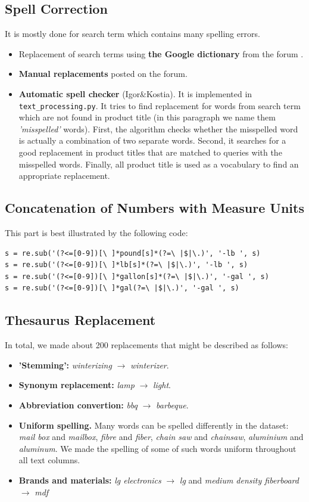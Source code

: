 \documentclass[12pt]{article}
\begin{document}
{{\subsection{Spell Correction}
It is mostly done for search term which contains many spelling errors.
\begin{itemize}
\item Replacement of search terms using \textbf{the Google dictionary} from the forum  \cite{Google_dict}.
\item \textbf{Manual replacements} posted on the forum.
\item \textbf{Automatic spell checker} (Igor\&Kostia). It is implemented in \texttt{text\_processing.py}. It tries to find replacement for words from search term which are not found in product title (in this paragraph we name them \emph{'misspelled'} words). First, the algorithm checks whether the misspelled word is actually a combination of two separate words. Second, it searches for a good replacement in product titles that are matched to queries with the misspelled words. Finally, all product title is used as a vocabulary to find an appropriate replacement.
\end{itemize}


\subsection{Concatenation of Numbers with Measure Units}
This part is best illustrated by the following code:

\begin{verbatim}
s = re.sub('(?<=[0-9])[\ ]*pound[s]*(?=\ |$|\.)', '-lb ', s)
s = re.sub('(?<=[0-9])[\ ]*lb[s]*(?=\ |$|\.)', '-lb ', s)
s = re.sub('(?<=[0-9])[\ ]*gallon[s]*(?=\ |$|\.)', '-gal ', s)
s = re.sub('(?<=[0-9])[\ ]*gal(?=\ |$|\.)', '-gal ', s)
\end{verbatim}


\subsection{Thesaurus Replacement}
In total, we made about 200 replacements that might be described as follows:

\begin{itemize}
\item \textbf{'Stemming':} \emph{winterizing}	$\rightarrow$ \emph{winterizer}.
\item \textbf{Synonym replacement:} \emph{lamp}	$\rightarrow$ \emph{light}.
\item \textbf{Abbreviation convertion:} \emph{bbq}	$\rightarrow$ \emph{barbeque}.
\item \textbf{Uniform spelling.} Many words can be spelled differently in the dataset: \emph{mail box} and \emph{mailbox}, \emph{fibre} and \emph{fiber}, \emph{chain saw} and \emph{chainsaw}, \emph{aluminium} and \emph{aluminum}. We made the spelling of some of such words uniform throughout all text columns.
\item \textbf{Brands and materials:} \emph{lg electronics} $\rightarrow$    \emph{lg} and  \emph{medium density fiberboard}  $\rightarrow$  \emph{mdf}
\end{itemize}



}}
\end{document}
